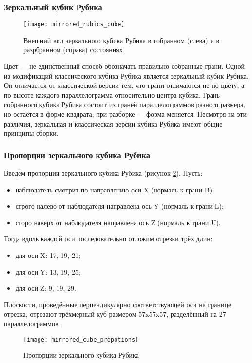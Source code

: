 \subsubsection{Зеркальный кубик Рубика}
\begin{figure}[ht]
	\centering
	\texttt{[image: mirrored\_rubics\_cube]}
	\caption{Внешний вид зеркального кубика Рубика в собранном (слева) и в разрбранном (справа) состояниях}
	\label{fig:mirrored_cube}
\end{figure}

Цвет --- не единственный способ обозначать правильно собранные грани. Одной из модификаций классического кубика Рубика является зеркальный кубик Рубика. Он отличается от классической версии тем, что грани отличаются не по цвету, а по высоте каждого параллелограмма относительно центра кубика. Грань собранного кубика Рубика состоит из граней параллелограммов разного размера, но остаётся в форме квадрата; при разборке --- форма меняется. Несмотря на эти различия, зеркальная и классическая версии кубика Рубика имеют общие принципы сборки.

\subsubsection{Пропорции зеркального кубика Рубика}
Введём пропорции зеркального кубика Рубика (рисунок \ref{fig:mirrored_cube_proportions}). Пусть:
\begin{itemize}
	\item наблюдатель смотрит по направлению оси X (нормаль к грани B);
	\item строго налево от наблюдателя направлена ось Y (нормаль к грани L);
	\item сторо наверх от наблюдателя направлена ось Z (нормаль к грани U).
\end{itemize}

Тогда вдоль каждой оси последовательно отложим отрезки трёх длин:
\begin{itemize}
	\item для оси X: 17, 19, 21;
	\item для оси Y: 13, 19, 25;
	\item для оси Z: 9, 19, 29.
\end{itemize}

Плоскости, проведённые перпендикулярно соответствующей оси на границе отрезка, отрезают трёхмерный куб размером 57x57x57, разделённый на 27 параллелограммов. 

\begin{figure}[ht]
	\centering
	\texttt{[image: mirrored\_cube\_propotions]}
	\caption{Пропорции зеркального кубика Рубика}
	\label{fig:mirrored_cube_proportions}
\end{figure}

